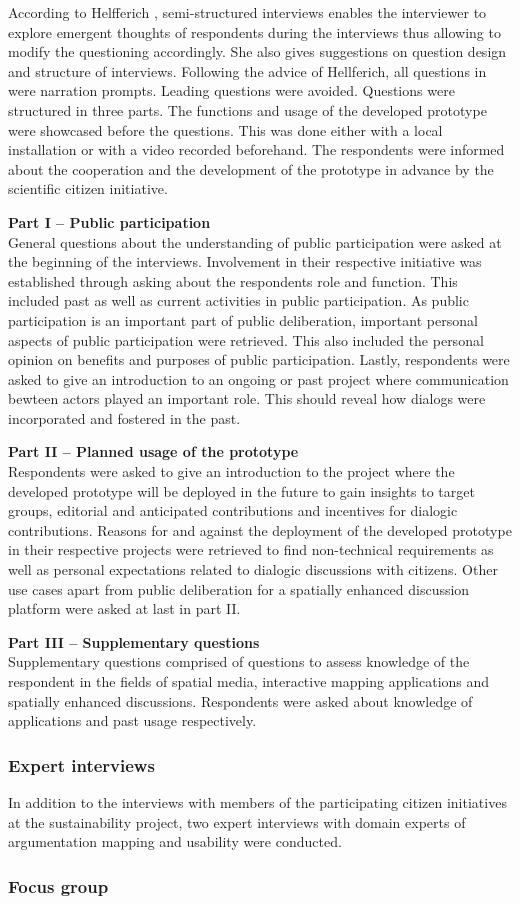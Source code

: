According to Helfferich \cite{helfferich2005}, semi-structured interviews enables the interviewer to explore emergent thoughts of respondents during the interviews thus allowing to modify the questioning accordingly.  She also gives suggestions on question design and structure of interviews. Following the advice of Hellferich, all questions in were narration prompts. Leading questions were avoided. Questions were structured in three parts. The functions and usage of the developed prototype were showcased before the questions. This was done either with a local installation or with a video recorded beforehand. The respondents were informed about the cooperation and the development of the prototype in advance by the scientific citizen initiative.

\textbf{Part I -- Public participation}\\
General questions about the understanding of public participation were asked at the beginning of the interviews. Involvement in their respective initiative was established through asking about the respondents role and function. This included past as well as current activities in public participation. As public participation is an important part of public deliberation, important personal aspects of public participation were retrieved. This also included the personal opinion on benefits and purposes of public participation. Lastly, respondents were asked to give an introduction to an ongoing or past project where communication bewteen actors played an important role. This should reveal how dialogs were incorporated and fostered in the past.

\textbf{Part II -- Planned usage of the prototype}\\
Respondents were asked to give an introduction to the project where the developed prototype will be deployed in the future to gain insights to target groups, editorial and anticipated contributions and incentives for dialogic contributions. Reasons for and against the deployment of the developed prototype in their respective projects were retrieved to find non-technical requirements as well as personal expectations related to dialogic discussions with citizens. Other use cases apart from public deliberation for a spatially enhanced discussion platform were asked at last in part II.

\textbf{Part III -- Supplementary questions}\\
Supplementary questions comprised of questions to assess knowledge of the respondent in the fields of spatial media, interactive mapping applications and spatially enhanced discussions. Respondents were asked about knowledge of applications and past usage respectively.

\subsubsection{Expert interviews}

In addition to the interviews with members of the participating citizen initiatives at the sustainability project, two expert interviews with domain experts of argumentation mapping and usability were conducted.


\subsubsection{Focus group}

